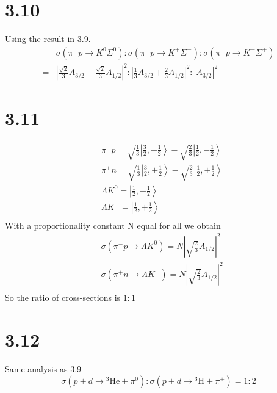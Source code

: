 \documentclass{article}
\begin{document}
\begin{CJK*}{GBK}{song}
\section{3.10}
Using the result in 3.9.
\begin{equation}
\begin{aligned}
&\sigma(\pi^-p\rightarrow K^0\Sigma^0):\sigma(\pi^-p\rightarrow K^+\Sigma^-):\sigma(\pi^+p\rightarrow K^+\Sigma^+)\\
=&\left|\frac{\sqrt{2}}{3}A_{3/2}-\frac{\sqrt{2}}{3}A_{1/2}\right|^2:\left|\frac{1}{3}A_{3/2}+\frac{2}{3}A_{1/2}\right|^2:\left|A_{3/2}\right|^2
\end{aligned}
\end{equation}

\section{3.11}

\begin{equation}
\begin{aligned}
&\pi^-p=\sqrt{\frac{1}{3}}\left|\frac{3}{2},-\frac{1}{2}\right\rangle-\sqrt{\frac{2}{3}}\left|\frac{1}{2},-\frac{1}{2}\right\rangle\\
&\pi^+n=\sqrt{\frac{1}{3}}\left|\frac{3}{2},+\frac{1}{2}\right\rangle-\sqrt{\frac{2}{3}}\left|\frac{1}{2},+\frac{1}{2}\right\rangle\\
&\Lambda K^0=\left|\frac{1}{2},-\frac{1}{2}\right\rangle\\
&\Lambda K^+=\left|\frac{1}{2},+\frac{1}{2}\right\rangle\\
\end{aligned}
\end{equation}
With a proportionality constant N equal for all we obtain
\begin{equation}
\begin{aligned}
&\sigma(\pi^-p\rightarrow\Lambda K^0)=N\left|\sqrt{\frac{2}{3}}A_{1/2}\right|^2\\
&\sigma(\pi^+n\rightarrow\Lambda K^+)=N\left|\sqrt{\frac{2}{3}}A_{1/2}\right|^2\\
\end{aligned}
\end{equation}
So the ratio of cross-sections is $1:1$

\section{3.12}
Same analysis as 3.9
\begin{equation}
\sigma(p+d\rightarrow {}^3\text{He}+\pi^0):\sigma(p+d\rightarrow {}^3\text{H}+\pi^+)=1:2
\end{equation}


\end{CJK*}
\end{document}
